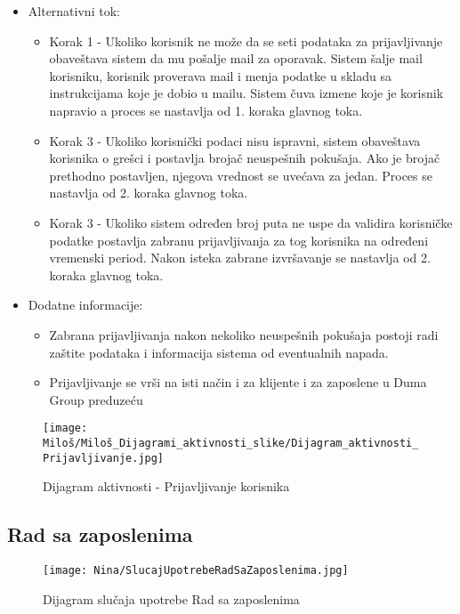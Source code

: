 \documentclass[a4paper]{article}
\begin{document}
\begin{itemize}
\begin{enumerate}
        \end{enumerate}
    \item Alternativni tok:
        \begin{itemize}
            \item Korak 1 - Ukoliko korisnik ne može da se seti podataka za prijavljivanje obaveštava sistem da mu pošalje mail za oporavak. Sistem šalje mail korisniku, korisnik proverava mail i menja podatke u skladu sa instrukcijama koje je dobio u mailu. Sistem čuva izmene koje je korisnik napravio a proces se nastavlja od 1. koraka glavnog toka.
            \item Korak 3 - Ukoliko korisnički podaci nisu ispravni, sistem obaveštava korisnika o grešci i postavlja brojač neuspešnih pokušaja.
            Ako je brojač prethodno postavljen, njegova vrednost se uvećava za jedan. Proces se nastavlja od 2. koraka glavnog toka.
            \item Korak 3 - Ukoliko sistem određen broj puta ne uspe da validira korisničke podatke postavlja zabranu prijavljivanja za tog korisnika na određeni vremenski period. Nakon isteka zabrane izvršavanje se nastavlja od 2. koraka glavnog toka.
        \end{itemize}
    \item Dodatne informacije:
        \begin{itemize}
            \item Zabrana prijavljivanja nakon nekoliko neuspešnih pokušaja postoji radi zaštite podataka i informacija sistema od eventualnih napada.
            \item Prijavljivanje se vrši na isti način i za klijente i za zaposlene u Duma Group preduzeću
        \end{itemize}
\end{itemize}


\begin{figure}[htp]
    \centering
    \texttt{[image: Miloš/Miloš\_Dijagrami\_aktivnosti\_slike/Dijagram\_aktivnosti\_Prijavljivanje.jpg]}
    \caption{Dijagram aktivnosti - Prijavljivanje korisnika}
    \label{fig:Prijavljivanje aktivnost}
\end{figure}



\subsection{Rad sa zaposlenima}

\begin{figure}[H]
    \centering
    \texttt{[image: Nina/SlucajUpotrebeRadSaZaposlenima.jpg]}
    \caption{Dijagram slučaja upotrebe Rad sa zaposlenima}
    \label{fig:RegistracijaZ}
\end{figure}
\end{document}
